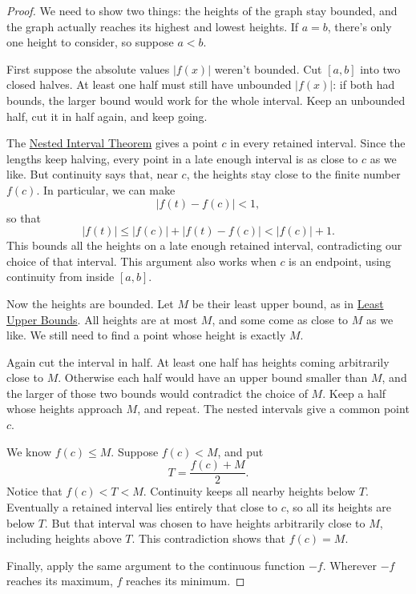 \begin{proof}
We need to show two things: the heights of the graph stay bounded, and
the graph actually reaches its highest and lowest heights. If $a=b$,
there's only one height to consider, so suppose $a<b$.

First suppose the absolute values $|f(x)|$ weren't bounded. Cut $[a,b]$
into two closed halves. At least one half must still have unbounded
$|f(x)|$: if both had bounds, the larger bound would work for the whole
interval. Keep an unbounded half, cut it in half again, and keep going.

The \hyperref[sec:nested-interval-theorem]{Nested Interval Theorem} gives a
point $c$ in every retained interval. Since the lengths keep halving,
every point in a late enough interval is as close to $c$ as we like.
But continuity says that, near $c$, the heights stay close to the finite
number $f(c)$. In particular, we can make
$$|f(t)-f(c)|<1,$$
so that
$$|f(t)|\leq |f(c)|+|f(t)-f(c)|<|f(c)|+1.$$
This bounds all the heights on a late enough retained interval,
contradicting our choice of that interval. This argument also works when
$c$ is an endpoint, using continuity from inside $[a,b]$.

Now the heights are bounded. Let $M$ be their least upper bound, as in
\hyperref[sec:least-upper-bounds]{Least Upper Bounds}. All heights are at
most $M$, and some come as close to $M$ as we like. We still need to find
a point whose height is exactly $M$.

Again cut the interval in half. At least one half has heights coming
arbitrarily close to $M$. Otherwise each half would have an upper bound
smaller than $M$, and the larger of those two bounds would contradict
the choice of $M$. Keep a half whose heights approach $M$, and repeat.
The nested intervals give a common point $c$.

We know $f(c)\leq M$. Suppose $f(c)<M$, and put
$$T=\frac{f(c)+M}{2}.$$
Notice that $f(c)<T<M$. Continuity keeps all nearby heights below $T$.
Eventually a retained interval lies entirely that close to $c$, so all
its heights are below $T$. But that interval was chosen to have heights
arbitrarily close to $M$, including heights above $T$. This contradiction
shows that $f(c)=M$.

Finally, apply the same argument to the continuous function $-f$.
Wherever $-f$ reaches its maximum, $f$ reaches its minimum.
\end{proof}



